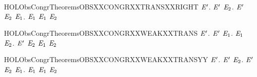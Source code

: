 \newcommand{\HOLObsCongrTheoremsOBSXXCONGRXXTRANSXXLEFT}{\UseVerbatim{HOLObsCongrTheoremsOBSXXCONGRXXTRANSXXLEFT}}
\begin{SaveVerbatim}{HOLObsCongrTheoremsOBSXXCONGRXXTRANSXXRIGHT}
\HOLTokenTurnstile{} \HOLSymConst{\HOLTokenForall{}} \ensuremath{\HOLBoundVar{E}\sp{\prime}}.
         \ensuremath{\HOLBoundVar{E}\sp{\prime}} \HOLSymConst{\HOLTokenImp{}}
       \HOLSymConst{\HOLTokenForall{}} \ensuremath{\HOLBoundVar{E}\sb{\mathrm{2}}}. \ensuremath{\HOLBoundVar{E}\sp{\prime}} \HOLTokenTransBegin{}\HOLTokenTransEnd \ensuremath{\HOLBoundVar{E}\sb{\mathrm{2}}} \HOLSymConst{\HOLTokenImp{}} \HOLSymConst{\HOLTokenExists{}}\ensuremath{\HOLBoundVar{E}\sb{\mathrm{1}}}.  \HOLTokenWeakTransBegin{}\HOLTokenWeakTransEnd \ensuremath{\HOLBoundVar{E}\sb{\mathrm{1}}} \HOLSymConst{\HOLTokenConj{}}  \ensuremath{\HOLBoundVar{E}\sb{\mathrm{1}}} \ensuremath{\HOLBoundVar{E}\sb{\mathrm{2}}}
\end{SaveVerbatim}
\newcommand{\HOLObsCongrTheoremsOBSXXCONGRXXTRANSXXRIGHT}{\UseVerbatim{HOLObsCongrTheoremsOBSXXCONGRXXTRANSXXRIGHT}}
\begin{SaveVerbatim}{HOLObsCongrTheoremsOBSXXCONGRXXWEAKXXTRANS}
\HOLTokenTurnstile{} \HOLSymConst{\HOLTokenForall{}} \ensuremath{\HOLBoundVar{E}\sp{\prime}}.
         \ensuremath{\HOLBoundVar{E}\sp{\prime}} \HOLSymConst{\HOLTokenImp{}}
       \HOLSymConst{\HOLTokenForall{}} \ensuremath{\HOLBoundVar{E}\sb{\mathrm{1}}}.  \HOLTokenWeakTransBegin{}\HOLTokenWeakTransEnd \ensuremath{\HOLBoundVar{E}\sb{\mathrm{1}}} \HOLSymConst{\HOLTokenImp{}} \HOLSymConst{\HOLTokenExists{}}\ensuremath{\HOLBoundVar{E}\sb{\mathrm{2}}}. \ensuremath{\HOLBoundVar{E}\sp{\prime}} \HOLTokenWeakTransBegin{}\HOLTokenWeakTransEnd \ensuremath{\HOLBoundVar{E}\sb{\mathrm{2}}} \HOLSymConst{\HOLTokenConj{}}  \ensuremath{\HOLBoundVar{E}\sb{\mathrm{1}}} \ensuremath{\HOLBoundVar{E}\sb{\mathrm{2}}}
\end{SaveVerbatim}
\newcommand{\HOLObsCongrTheoremsOBSXXCONGRXXWEAKXXTRANS}{\UseVerbatim{HOLObsCongrTheoremsOBSXXCONGRXXWEAKXXTRANS}}
\begin{SaveVerbatim}{HOLObsCongrTheoremsOBSXXCONGRXXWEAKXXTRANSYY}
\HOLTokenTurnstile{} \HOLSymConst{\HOLTokenForall{}} \ensuremath{\HOLBoundVar{E}\sp{\prime}}.
         \ensuremath{\HOLBoundVar{E}\sp{\prime}} \HOLSymConst{\HOLTokenImp{}}
       \HOLSymConst{\HOLTokenForall{}} \ensuremath{\HOLBoundVar{E}\sb{\mathrm{2}}}. \ensuremath{\HOLBoundVar{E}\sp{\prime}} \HOLTokenWeakTransBegin{}\HOLTokenWeakTransEnd \ensuremath{\HOLBoundVar{E}\sb{\mathrm{2}}} \HOLSymConst{\HOLTokenImp{}} \HOLSymConst{\HOLTokenExists{}}\ensuremath{\HOLBoundVar{E}\sb{\mathrm{1}}}.  \HOLTokenWeakTransBegin{}\HOLTokenWeakTransEnd \ensuremath{\HOLBoundVar{E}\sb{\mathrm{1}}} \HOLSymConst{\HOLTokenConj{}}  \ensuremath{\HOLBoundVar{E}\sb{\mathrm{1}}} \ensuremath{\HOLBoundVar{E}\sb{\mathrm{2}}}
\end{SaveVerbatim}
